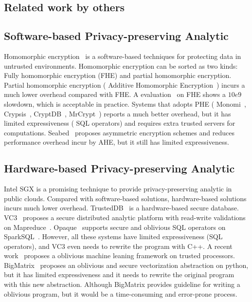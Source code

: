


\subsection{Related work by others} 
\label{sec:others-work}\vspace{-.075in}

\subsection{Software-based Privacy-preserving Analytic}
Homomorphic encryption~\cite{fullmomo:stoc09,paillier,elgamal} is a 
software-based
techniques for protecting data in untrusted environments. Homomorphic encryption
can be sorted as two kinds: Fully homomorphic encryption (FHE) and partial 
homomorphic encryption.
Partial homomorphic encryption (\eg{} Additive Homomorphic 
Encryption~\cite{paillier})
incurs a much lower overhead compared with FHE. A evaluation~\cite{homo:eval} on
FHE shows a $10e9$ slowdown, which is acceptable in practice.
Systems that adopts PHE (\eg{} Monomi~\cite{monomi:vldb13},
Crypsis~\cite{crypsis:hotcloud14}, CryptDB~\cite{cryptdb:sosp11},
MrCrypt~\cite{mrcrypt:oospsla14})
reports a much better overhead, but it has limited expressiveness
(\eg{} SQL operators) and requires extra trusted servers for computations.
Seabed~\cite{seabed:osdi16} proposes asymmetric encryption schemes and reduces 
performance overhead
incur by AHE, but it still has limited expressiveness.

\subsection{Hardware-based Privacy-preserving Analytic}
Intel SGX is a promising technique to provide privacy-preserving analytic
in public clouds. Compared with software-based solutions, hardware-based 
solutions
incurs much lower overhead. TrustedDB~\cite{trusteddb:sigmod11} is a
hardware-based secure database.
VC3~\cite{vc3:sp15} proposes a secure distributed analytic platform
with read-write validations on Mapreduce~\cite{mapreduce}. 
Opaque~\cite{opaque:nsdi17}
supports secure and oblivious SQL operators on 
SparkSQL~\cite{sparksql:sigmod15}.
However, all these systems have limited expressiveness (\eg SQL operators), and
VC3 even needs to rewrite the program with C++. A recent 
work~\cite{oblivious:security16} proposes a oblivious machine leaning
framework on trusted processors.
BigMatrix~\cite{bigmatrix:ccs17} proposes an oblivious and secure vectorization
abstraction on python, but it has limited expressiveness and it needs to
rewrite the original program with this new abstraction.
Although BigMatrix provides guideline for
writing a oblivious program, but it would be a time-consuming and error-prone
process.

